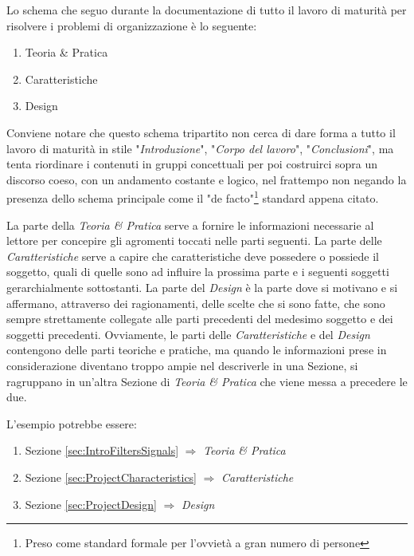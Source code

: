 \documentclass[a4paper, 10pt, final]{article} %
\begin{document}
    \begin{samepage}
        \noindent Lo schema che seguo durante la documentazione di tutto il lavoro di maturit\`{a} per risolvere i problemi di organizzazione \`{e} lo seguente:
        \begin{enumerate}[label=\emph{(\roman*)}]
            \item Teoria \& Pratica
            \item Caratteristiche
            \item Design
        \end{enumerate}
    \end{samepage}
    Conviene notare che questo schema tripartito non cerca di dare forma a tutto il lavoro di maturit\`{a} in stile "\emph{Introduzione}", "\emph{Corpo del lavoro}", "\emph{Conclusioni}", ma tenta riordinare i contenuti in gruppi concettuali per poi costruirci sopra un discorso coeso, con un andamento costante e logico, nel frattempo non negando la presenza dello schema principale come il "de facto"\footnote{Preso come standard formale per l'ovviet\`{a} a gran numero di persone} standard appena citato.
    
    La parte della \emph{Teoria \& Pratica} serve a fornire le informazioni necessarie al lettore per concepire gli agromenti toccati nelle parti seguenti.
    La parte delle \emph{Caratteristiche} serve a capire che caratteristiche deve possedere o possiede il soggetto, quali di quelle sono ad influire la prossima parte e i seguenti soggetti gerarchialmente sottostanti.
    La parte del \emph{Design} \`{e} la parte dove si motivano e si affermano, attraverso dei ragionamenti, delle scelte che si sono fatte, che sono sempre strettamente collegate alle parti precedenti del medesimo soggetto e dei soggetti precedenti.
    Ovviamente, le parti delle \emph{Caratteristiche} e del \emph{Design} contengono delle parti teoriche e pratiche, ma quando le informazioni prese in considerazione diventano troppo ampie nel descriverle in una Sezione, si ragruppano in un'altra Sezione di \emph{Teoria \& Pratica} che viene messa a precedere le due.
    
    \begin{samepage}
        \noindent L'esempio potrebbe essere:
        \begin{enumerate}[label=\emph{(\roman*)}]
            \item Sezione \ref{sec:IntroFiltersSignals} $\Rightarrow$ \emph{Teoria \& Pratica}
            \item Sezione \ref{sec:ProjectCharacteristics} $\Rightarrow$ \emph{Caratteristiche}
            \item Sezione \ref{sec:ProjectDesign} $\Rightarrow$ \emph{Design}
        \end{enumerate}
    \end{samepage}
\end{document}
